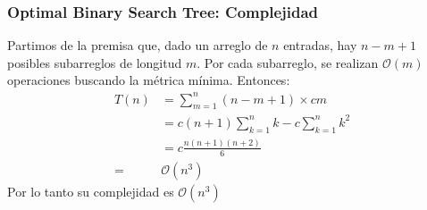 \documentclass[10pt]{beamer}
\begin{document}
    \begin{frame}
        \frametitle{Optimal Binary Search Tree: Complejidad}
        Partimos de la premisa que, dado un arreglo de $n$ entradas, hay $n-m+1$ posibles subarreglos de longitud $m$.
        Por cada subarreglo, se realizan $\mathcal{O}(m)$ operaciones buscando la métrica mínima.
        Entonces:
        \begin{align*}
            T(n) &= \sum_{m = 1}^n (n-m+1) \times cm \\
            &= c(n+1)\sum_{k = 1}^n k - c\sum_{k=1}^n k^2\\
            &= c\frac{n(n+1)(n+2)}{6}\\ 
            =& \mathcal{O}(n^3)
        \end{align*}
        Por lo tanto su complejidad es $\mathcal{O}(n^3)$
    \end{frame}
\end{document}
